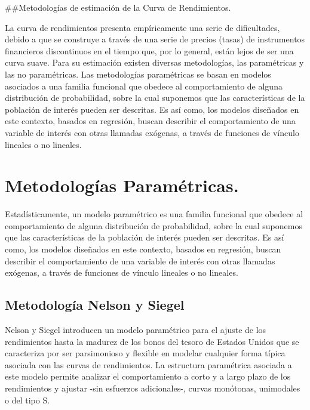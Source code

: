 \documentclass[
  12pt,
]{krantz}
\begin{document}
\#\#Metodologías de estimación de la Curva de Rendimientos.

La curva de rendimientos presenta empíricamente una serie de dificultades, debido a que se construye a través de una serie de precios (tasas) de instrumentos financieros discontinuos en el tiempo que, por lo general, están lejos de ser una curva suave. Para su estimación existen diversas metodologías, las paramétricas y las no paramétricas. Las metodologías paramétricas se basan en modelos asociados a una familia funcional que obedece al comportamiento de alguna distribución de probabilidad, sobre la cual suponemos que las características de la población de interés pueden ser descritas. Es así como, los modelos diseñados en este contexto, basados en regresión, buscan describir el comportamiento de una variable de interés con otras llamadas exógenas, a través de funciones de vínculo lineales o no lineales.

\hypertarget{metodologias-parametricas.}{%
\section{Metodologías Paramétricas.}\label{metodologias-parametricas.}}

Estadísticamente, un modelo paramétrico es una familia funcional que
obedece al comportamiento de alguna distribución de probabilidad, sobre la cual suponemos que las características de la población de interés
pueden ser descritas. Es así como, los modelos diseñados en este contexto,
basados en regresión, buscan describir el comportamiento de una
variable de interés con otras llamadas exógenas, a través de funciones de
vínculo lineales o no lineales.

\hypertarget{metodologia-nelson-y-siegel}{%
\subsection{Metodología Nelson y Siegel}\label{metodologia-nelson-y-siegel}}

Nelson y Siegel introducen un modelo paramétrico para el ajuste
de los rendimientos hasta la madurez de los bonos del tesoro de Estados
Unidos que se caracteriza por ser parsimonioso y flexible en modelar
cualquier forma típica asociada con las curvas de rendimientos. La estructura
paramétrica asociada a este modelo permite analizar el comportamiento
a corto y a largo plazo de los rendimientos y ajustar -sin
esfuerzos adicionales-, curvas monótonas, unimodales o del tipo S.
\end{document}
